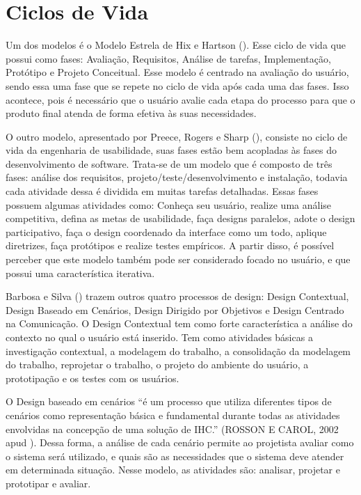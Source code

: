 \chapter{Ciclos de Vida}

Um dos modelos é o Modelo Estrela de Hix e Hartson (\citeyear{hix}). Esse ciclo de vida que possui como fases: Avaliação, Requisitos, Análise de tarefas, 
Implementação, Protótipo e Projeto Conceitual. Esse modelo é centrado na avaliação do usuário, sendo essa uma fase que se repete no ciclo de vida após cada uma das fases.
Isso acontece, pois é necessário que o usuário avalie cada etapa do processo para que o produto final atenda de forma efetiva às suas necessidades.

O outro modelo, apresentado por Preece, Rogers e Sharp (\citeyear{preece}), consiste no ciclo de vida da engenharia de usabilidade, suas fases estão bem acopladas às fases 
do desenvolvimento de software. Trata-se de um modelo que é composto de três fases: análise dos requisitos, projeto/teste/desenvolvimento e instalação, todavia 
cada atividade dessa é dividida em muitas tarefas detalhadas. Essas fases possuem algumas atividades como: Conheça seu usuário, realize uma análise competitiva, 
defina as metas de usabilidade, faça designs paralelos, adote o design participativo, faça o design coordenado da interface como um todo, aplique diretrizes, 
faça protótipos e realize testes empíricos. A partir disso, é possível perceber que este modelo também pode ser considerado focado no usuário, e que possui uma 
característica iterativa.

Barbosa e Silva (\citeyear{BARBOSA}) trazem outros quatro processos de design: Design Contextual, Design Baseado em Cenários, Design Dirigido por Objetivos e Design Centrado na 
Comunicação. O Design Contextual tem como forte característica a análise do contexto no qual o usuário está inserido. Tem como atividades básicas a investigação contextual,
a modelagem do trabalho, a consolidação da modelagem do trabalho, reprojetar o trabalho, o projeto do ambiente do usuário, a prototipação e os testes com os usuários.

O Design baseado em cenários “é um processo que utiliza diferentes tipos de cenários como representação básica e fundamental durante todas as atividades envolvidas 
na concepção de uma solução de IHC.” (ROSSON E CAROL, 2002 apud \cite{BARBOSA}). Dessa forma, a análise de cada cenário permite ao projetista avaliar como o 
sistema será utilizado, e quais são as necessidades que o sistema deve atender em determinada situação. Nesse modelo, as atividades são: analisar, projetar e prototipar 
e avaliar.

